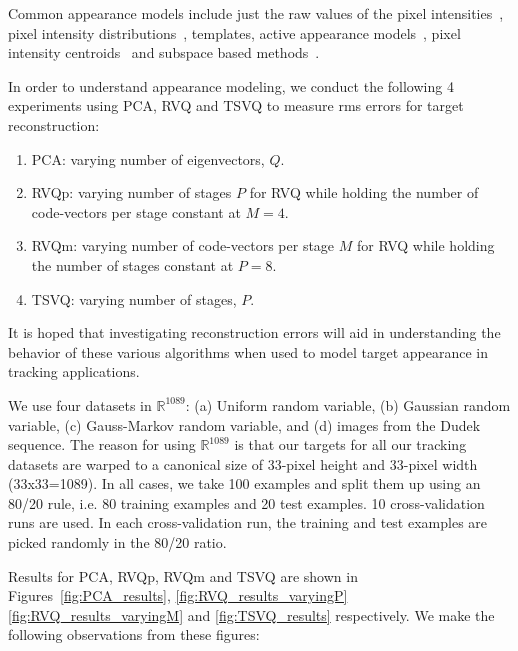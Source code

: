 \begin{Body}
Common appearance models include just the raw values of the pixel intensities~\cite{2000_CNF_TRK_Mallet, 1981_JNL_OpticalFlow_HornSchunck}, pixel intensity distributions~\cite{2002_JNL_MeanShiftFeatureSpaceAnalysis_Comaniciu, 1996_JNL_TRK_Zhu, 2002_JNL_TRK_Paragios, 2002_JNL_TRK_Elgammal}, templates\cite{1997_CNF_TRK_Fieguth}, active appearance models~\cite{1998_CNF_ActiveModels_Edwards, 1995_JNL_ActiveModels_Cootes}, pixel intensity centroids~\cite{1997_CNF_TRK_Heisele} and subspace based methods~\cite{1997_JNL_EigenTRK_Moghaddam, 1998_JNL_Eigentracking_Black}.  

In order to understand appearance modeling, we conduct the following 4 experiments using PCA, RVQ and TSVQ to measure rms errors for target reconstruction:

\begin{enumerate}
\item PCA: varying number of eigenvectors, $Q$.
\item RVQp: varying number of stages $P$ for RVQ while holding the number of code-vectors per stage constant at $M=4$.
\item RVQm: varying number of code-vectors per stage $M$ for RVQ while holding the number of stages constant at $P=8$.
\item TSVQ: varying number of stages, $P$.
\end{enumerate}

It is hoped that investigating reconstruction errors will aid in understanding the behavior of these various algorithms when used to model target appearance in tracking applications.

We use four datasets in $\mathbb{R}^{1089}$: (a) Uniform random variable, (b) Gaussian random variable, (c) Gauss-Markov random variable, and (d) images from the Dudek sequence. The reason for using $\mathbb{R}^{1089}$ is that our targets for all our tracking datasets are warped to a canonical size of 33-pixel height and 33-pixel width (33x33=1089). In all cases, we take 100 examples and split them up using an 80/20 rule, i.e. 80 training examples and 20 test examples. 10 cross-validation runs are used. In each cross-validation run, the training and test examples are picked randomly in the 80/20 ratio.

Results for PCA, RVQp, RVQm and TSVQ are shown in Figures~\ref{fig:PCA_results}, \ref{fig:RVQ_results_varyingP} \ref{fig:RVQ_results_varyingM} and \ref{fig:TSVQ_results} respectively.  We make the following observations from these figures:


\end{Body}
